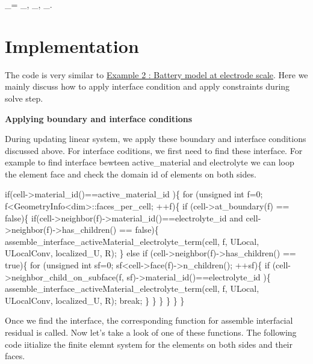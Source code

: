 _= \quad {} \Gamma_, \Gamma_, \Gamma_. \]  \hypertarget{battery_particle_Implementation}{}\section{Implementation}\label{battery_particle_Implementation}
The code is very similar to \hyperlink{battery_electrode_scale}{Example 2 \-: Battery model at electrode scale}. Here we mainly discuss how to apply interface condition and apply constraints during solve step.

{\bfseries Applying boundary and interface conditions}\par
 During updating linear system, we apply these boundary and interface conditions discussed above. For interface coditions, we first need to find these interface. For example to find interface bewteen active\-\_\-material and electrolyte we can loop the element face and check the domain id of elements on both sides. 
\begin{DoxyCode}
\textcolor{keywordflow}{if}(cell->material\_id()==active\_material\_id  )\{
    \textcolor{keywordflow}{for} (\textcolor{keywordtype}{unsigned} \textcolor{keywordtype}{int} f=0; f<GeometryInfo<dim>::faces\_per\_cell; ++f)\{
        \textcolor{keywordflow}{if} (cell->at\_boundary(f) == \textcolor{keyword}{false})\{
            \textcolor{keywordflow}{if}(cell->neighbor(f)->material\_id()==electrolyte\_id  and cell->neighbor(f)->has\_children() == \textcolor{keyword}{
      false})\{
              assemble\_interface\_activeMaterial\_electrolyte\_term(cell, f, ULocal, ULocalConv, localized\_U, 
      R);                                          
            \}
            \textcolor{keywordflow}{else} \textcolor{keywordflow}{if} (cell->neighbor(f)->has\_children() == \textcolor{keyword}{true})\{
                \textcolor{keywordflow}{for} (\textcolor{keywordtype}{unsigned} \textcolor{keywordtype}{int} sf=0; sf<cell->face(f)->n\_children(); ++sf)\{
                    \textcolor{keywordflow}{if} (cell->neighbor\_child\_on\_subface(f, sf)->material\_id()==electrolyte\_id )\{
                      assemble\_interface\_activeMaterial\_electrolyte\_term(cell, f, ULocal, ULocalConv, 
      localized\_U, R);                                                                
                        \textcolor{keywordflow}{break};
                    \}
                \}
            \}
        \}
    \}
\}
\end{DoxyCode}
 Once we find the interface, the corresponding function for assemble interfacial residual is called. Now let's take a look of one of these functions. The following code iitialize the finite elemnt system for the elements on both sides and their faces. 

